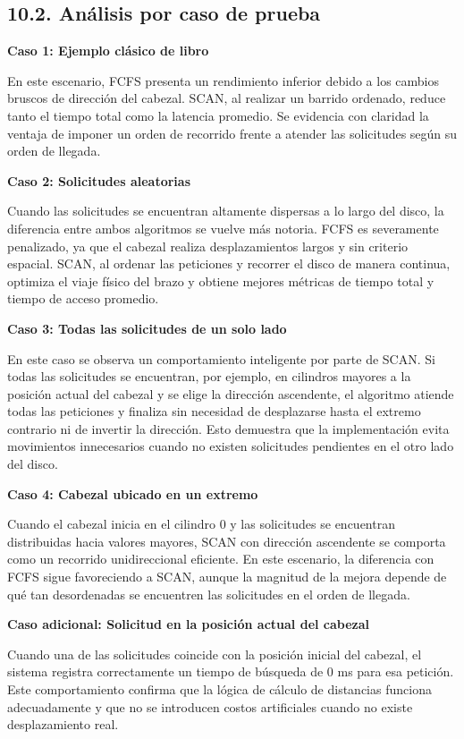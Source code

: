 \documentclass[14pt,letterpaper]{extarticle}
\begin{document}
\subsection*{10.2. Análisis por caso de prueba}

\textbf{Caso 1: Ejemplo clásico de libro}

En este escenario, FCFS presenta un rendimiento inferior debido a los cambios bruscos de dirección del cabezal. SCAN, al realizar un barrido ordenado, reduce tanto el tiempo total como la latencia promedio.
Se evidencia con claridad la ventaja de imponer un orden de recorrido frente a atender las solicitudes según su orden de llegada.

\textbf{Caso 2: Solicitudes aleatorias}

Cuando las solicitudes se encuentran altamente dispersas a lo largo del disco, la diferencia entre ambos algoritmos se vuelve más notoria. FCFS es severamente penalizado, ya que el cabezal realiza desplazamientos largos y sin criterio espacial. SCAN, al ordenar las peticiones y recorrer el disco de manera continua, optimiza el viaje físico del brazo y obtiene mejores métricas de tiempo total y tiempo de acceso promedio.

\newpage
\textbf{Caso 3: Todas las solicitudes de un solo lado}

En este caso se observa un comportamiento inteligente por parte de SCAN. Si todas las solicitudes se encuentran, por ejemplo, en cilindros mayores a la posición actual del cabezal y se elige la dirección ascendente, el algoritmo atiende todas las peticiones y finaliza sin necesidad de desplazarse hasta el extremo contrario ni de invertir la dirección. Esto demuestra que la implementación evita movimientos innecesarios cuando no existen solicitudes pendientes en el otro lado del disco.

\textbf{Caso 4: Cabezal ubicado en un extremo}

Cuando el cabezal inicia en el cilindro 0 y las solicitudes se encuentran distribuidas hacia valores mayores, SCAN con dirección ascendente se comporta como un recorrido unidireccional eficiente. En este escenario, la diferencia con FCFS sigue favoreciendo a SCAN, aunque la magnitud de la mejora depende de qué tan desordenadas se encuentren las solicitudes en el orden de llegada.

\textbf{Caso adicional: Solicitud en la posición actual del cabezal}

Cuando una de las solicitudes coincide con la posición inicial del cabezal, el sistema registra correctamente un tiempo de búsqueda de 0 ms para esa petición. Este comportamiento confirma que la lógica de cálculo de distancias funciona adecuadamente y que no se introducen costos artificiales cuando no existe desplazamiento real.
\end{document}
